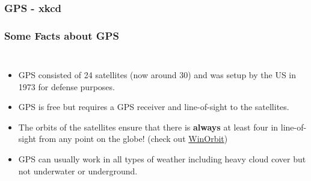 \begin{frame}
\frametitle{GPS - xkcd}
\end{frame}

\begin{frame}
\frametitle{Some Facts about GPS}
\begin{columns}
\begin{itemize}
\item GPS consisted of 24 satellites (now around 30) and was setup by the US in 1973 for defense purposes.
\item GPS is free but requires a GPS receiver and line-of-sight to the satellites.
\item The orbits of the satellites ensure that there is \textbf{always} at least four in line-of-sight from any point on the globe! (check out \href{http://www.sat-net.com/winorbit/}{WinOrbit})
\item GPS can usually work in all types of weather including heavy cloud cover but not underwater or underground.
\end{itemize}
\end{columns}
\end{frame}

